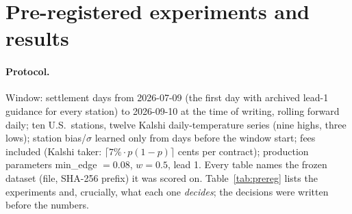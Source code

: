 \documentclass[sigconf,review,anonymous]{acmart}
\begin{document}
\section{Pre-registered experiments and results}
\label{sec:results}

\paragraph{Protocol.} Window: settlement days from 2026-07-09 (the first day
with archived lead-1 guidance for every station) to 2026-09-10 at the time
of writing, rolling
forward daily; ten U.S.\ stations, twelve Kalshi daily-temperature series
(nine highs, three lows); station bias/$\sigma$ learned only from days before
the window start; fees included (Kalshi taker: $\lceil 7\%\cdot p(1-p)\rceil$
cents per contract); production parameters min\_edge $=0.08$, $w=0.5$, lead 1.
Every table names the frozen dataset (file, SHA-256 prefix) it was scored on.
Table~\ref{tab:prereg} lists the experiments and, crucially, what each one
\emph{decides}; the decisions were written before the numbers.
\end{document}
